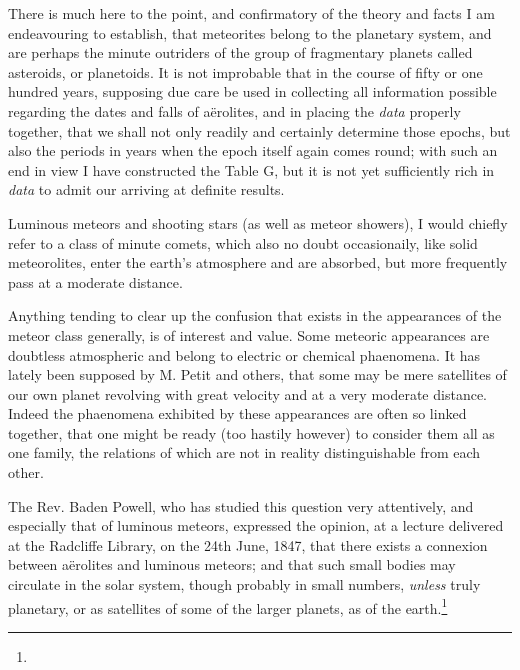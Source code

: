 \documentclass[a4paper, 12pt, oneside]{article}
\begin{document}
There is much here to the point, and confirmatory of the theory and facts I am endeavouring to establish, that meteorites belong to the planetary system, and are perhaps the minute outriders of the group of fragmentary planets called asteroids, or planetoids. It is not improbable that in the course of fifty or one hundred years, supposing due care be used in collecting all information possible regarding the dates and falls of aërolites, and in placing the \emph{data} properly together, that we shall not only readily and certainly determine those epochs, but also the periods in years when the epoch itself again comes round; with such an end in view I have constructed the Table G, but it is not yet sufficiently rich in \emph{data} to admit our arriving at definite results.

Luminous meteors and shooting stars (as well as meteor showers), I would chiefly refer to a class of minute comets, which also no doubt occasionaily, like solid meteorolites, enter the earth's atmosphere and are absorbed, but more frequently pass at a moderate distance.

Anything tending to clear up the confusion that exists in the appearances of the meteor class generally, is of interest and value. Some meteoric appearances are doubtless atmospheric and belong to electric or chemical phaenomena. It has lately been supposed by M. Petit and others, that some may be mere satellites of our own planet revolving with great velocity and at a very moderate distance. Indeed the phaenomena exhibited by these appearances are often so linked together, that one might be ready (too hastily however) to consider them all as one family, the relations of which are not in reality distinguishable from each other.

The Rev. Baden Powell, who has studied this question very attentively, and especially that of luminous meteors, expressed the opinion, at a lecture delivered at the Radcliffe Library, on the 24th June, 1847, that there exists a connexion between aërolites and luminous meteors; and that such small bodies may circulate in the solar system, though probably in small numbers, \emph{unless} truly planetary, or as satellites of some of the larger planets, as of the earth.\footnote{}
\end{document}
